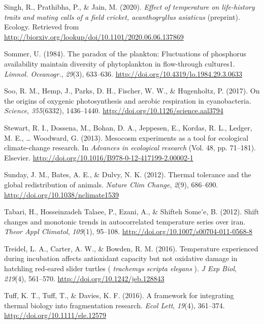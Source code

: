 \documentclass[12pt,twoside]{reedthesis}
\begin{document}
\leavevmode\hypertarget{ref-singh_effect_2020}{}%
Singh, R., Prathibha, P., \& Jain, M. (2020). \emph{Effect of temperature on life-history traits and mating calls of a field cricket, \textup{acanthogryllus asiaticus}} (preprint). Ecology. Retrieved from \url{http://biorxiv.org/lookup/doi/10.1101/2020.06.06.137869}

\leavevmode\hypertarget{ref-sommer_paradox_1984}{}%
Sommer, U. (1984). The paradox of the plankton: Fluctuations of phosphorus availability maintain diversity of phytoplankton in flow-through cultures1. \emph{Limnol. Oceanogr.}, \emph{29}(3), 633--636. \url{http://doi.org/10.4319/lo.1984.29.3.0633}

\leavevmode\hypertarget{ref-soo_origins_2017}{}%
Soo, R. M., Hemp, J., Parks, D. H., Fischer, W. W., \& Hugenholtz, P. (2017). On the origins of oxygenic photosynthesis and aerobic respiration in cyanobacteria. \emph{Science}, \emph{355}(6332), 1436--1440. \url{http://doi.org/10.1126/science.aal3794}

\leavevmode\hypertarget{ref-stewart_mesocosm_2013}{}%
Stewart, R. I., Dossena, M., Bohan, D. A., Jeppesen, E., Kordas, R. L., Ledger, M. E., \ldots{} Woodward, G. (2013). Mesocosm experiments as a tool for ecological climate-change research. In \emph{Advances in ecological research} (Vol. 48, pp. 71--181). Elsevier. \url{http://doi.org/10.1016/B978-0-12-417199-2.00002-1}

\leavevmode\hypertarget{ref-sunday_thermal_2012}{}%
Sunday, J. M., Bates, A. E., \& Dulvy, N. K. (2012). Thermal tolerance and the global redistribution of animals. \emph{Nature Clim Change}, \emph{2}(9), 686--690. \url{http://doi.org/10.1038/nclimate1539}

\leavevmode\hypertarget{ref-tabari_shift_2012}{}%
Tabari, H., Hosseinzadeh Talaee, P., Ezani, A., \& Shifteh Some'e, B. (2012). Shift changes and monotonic trends in autocorrelated temperature series over iran. \emph{Theor Appl Climatol}, \emph{109}(1), 95--108. \url{http://doi.org/10.1007/s00704-011-0568-8}

\leavevmode\hypertarget{ref-treidel_temperature_2016-1}{}%
Treidel, L. A., Carter, A. W., \& Bowden, R. M. (2016). Temperature experienced during incubation affects antioxidant capacity but not oxidative damage in hatchling red-eared slider turtles ( \emph{trachemys scripta elegans} ). \emph{J Exp Biol}, \emph{219}(4), 561--570. \url{http://doi.org/10.1242/jeb.128843}

\leavevmode\hypertarget{ref-tuff_framework_2016}{}%
Tuff, K. T., Tuff, T., \& Davies, K. F. (2016). A framework for integrating thermal biology into fragmentation research. \emph{Ecol Lett}, \emph{19}(4), 361--374. \url{http://doi.org/10.1111/ele.12579}
\end{document}
